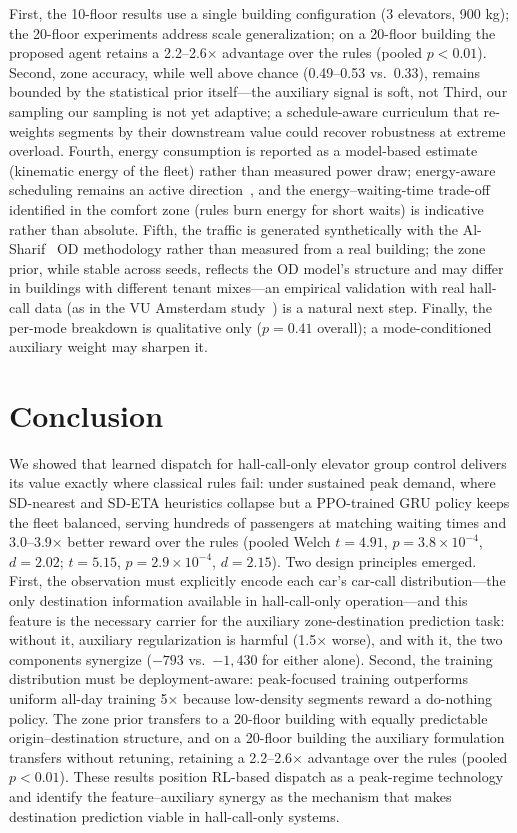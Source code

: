 \documentclass{ieeeaccess}
\begin{document}
First, the 10-floor results use a single building configuration (3
elevators, 900 kg); the 20-floor experiments address scale
generalization; on a 20-floor building the proposed agent retains a
2.2--2.6$\times$ advantage over the rules (pooled $p < 0.01$).
Second, zone accuracy, while well
above chance (0.49--0.53 vs.~0.33), remains bounded by the
statistical prior itself---the auxiliary signal is soft, not
Third, our sampling
our sampling is not yet adaptive; a schedule-aware curriculum that
re-weights segments by their downstream value could recover
robustness at extreme overload. Fourth, energy consumption is
reported as a model-based estimate (kinematic energy of the fleet)
rather than measured power draw; energy-aware scheduling
remains an active direction~\cite{maleki2023energy}, and the
energy--waiting-time trade-off
identified in the comfort zone (rules burn energy for short waits)
is indicative rather than absolute. Fifth, the traffic is generated
synthetically with the Al-Sharif~\cite{alsharif2020traffic} OD
methodology rather than measured from a real building; the zone
prior, while stable across seeds, reflects the OD model's structure
and may differ in buildings with different tenant mixes---an
empirical validation with real hall-call data (as in
the VU Amsterdam study~\cite{vu2025rl}) is a natural next step.
Finally, the per-mode breakdown
is qualitative only ($p = 0.41$ overall); a mode-conditioned
auxiliary weight may sharpen it.

\section{Conclusion}
\label{sec:conclusion}

We showed that learned dispatch for hall-call-only elevator group
control delivers its value exactly where classical rules fail:
under sustained peak demand, where SD-nearest and SD-ETA heuristics
collapse but a PPO-trained GRU policy keeps the fleet balanced,
serving hundreds of passengers at matching waiting times and
3.0--3.9$\times$ better reward over the rules (pooled Welch
$t = 4.91$, $p = 3.8\times10^{-4}$, $d = 2.02$; $t = 5.15$,
$p = 2.9\times10^{-4}$, $d = 2.15$). Two design principles emerged. First, the observation
must explicitly encode each car's car-call distribution---the only
destination information available in hall-call-only operation---and
this feature is the necessary carrier for the auxiliary
zone-destination prediction task: without it, auxiliary
regularization is harmful (1.5$\times$ worse), and with it, the two
components synergize ($-793$ vs.~$-1{,}430$ for either alone).
Second, the training distribution must be deployment-aware:
peak-focused training outperforms uniform all-day training 5$\times$
because low-density segments reward a do-nothing policy. The zone
prior transfers to a 20-floor building with equally predictable
origin--destination structure, and on a 20-floor building the
auxiliary formulation transfers without retuning, retaining a
2.2--2.6$\times$ advantage over the rules (pooled
$p < 0.01$). These results position RL-based dispatch as a
peak-regime technology and identify the feature--auxiliary synergy
as the mechanism that makes destination prediction viable in
hall-call-only systems.
\end{document}

